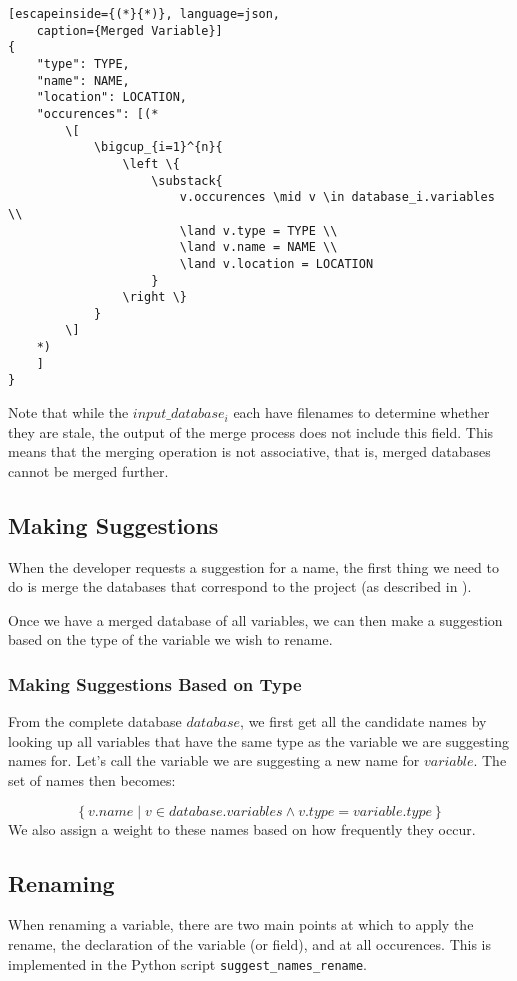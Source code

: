 \begin{lstlisting}[escapeinside={(*}{*)}, language=json,
	caption={Merged Variable}]
{
	"type": TYPE,
	"name": NAME,
	"location": LOCATION,
	"occurences": [(*
		\[
			\bigcup_{i=1}^{n}{
				\left \{
					\substack{
						v.occurences \mid v \in database_i.variables \\
						\land v.type = TYPE \\
						\land v.name = NAME \\
						\land v.location = LOCATION
					}
				\right \}
			}
		\]
	*)
	]
}
\end{lstlisting}
Note that while the $input\_database_i$ each have filenames to determine
whether they are stale, the output of the merge process does not include this
field. This means that the merging operation is not associative, that is, merged
databases cannot be merged further.

\subsection{Making Suggestions}
\label{sec:suggesting}

When the developer requests a suggestion for a name, the first thing we need to
do is merge the databases that correspond to the project (as described in
).

Once we have a merged database of all variables, we can then make a suggestion
based on the type of the variable we wish to rename.

\subsubsection{Making Suggestions Based on Type}

From the complete database $database$, we first get all the candidate names by
looking up all variables that have the same type as the variable we are
suggesting names for. Let's call the variable we are suggesting a new name for
$variable$. The set of names then becomes:

\[
	\left \{ v.name
			\mid v \in database.variables \land v.type = variable.type \right \}
\]
We also assign a weight to these names based on how frequently they occur.

\subsection{Renaming}

When renaming a variable, there are two main points at which to apply the
rename, the declaration of the variable (or field), and at all occurences.
This is implemented in the Python script \lstinline|suggest_names_rename|.

